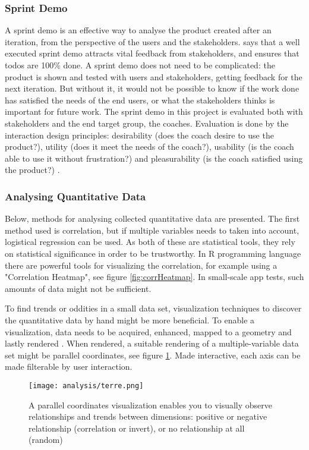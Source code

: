 \subsubsection{Sprint Demo}
A sprint demo is an effective way to analyse the product created after an iteration, from the perspective of the users and the stakeholders. \cite{kniberg} says that a well executed sprint demo attracts vital feedback from stakeholders, and ensures that todos are 100\% done. A sprint demo does not need to be complicated: the product is shown and tested with users and stakeholders, getting feedback for the next iteration. But without it, it would not be possible to know if the work done has satisfied the needs of the end users, or what the stakeholders thinks is important for future work. The sprint demo in this project is evaluated both with stakeholders and the end target group, the coaches. Evaluation is done by the interaction design principles: desirability (does the coach desire to use the product?), utility (does it meet the needs of the coach?), usability (is the coach able to use it without frustration?) and pleasurability (is the coach satisfied using the product?) \citep{lowgren}.

\subsubsection{Analysing Quantitative Data}
Below, methods for analysing collected quantitative data are presented. The first method used is correlation, but if multiple variables needs to taken into account, logistical regression can be used. As both of these are statistical tools, they rely on statistical significance in order to be trustworthy. In R programming language there are powerful tools for visualizing the correlation, for example using a "Correlation Heatmap", see figure \ref{fig:corrHeatmap}. In small-scale app tests, such amounts of data might not be sufficient.

To find trends or oddities in a small data set, visualization techniques to discover the quantitative data by hand might be more beneficial. To enable a visualization, data needs to be acquired, enhanced, mapped to a geometry and lastly rendered \citep{timo-ropinski-liu}. When rendered, a suitable rendering of a multiple-variable data set might be parallel coordinates, see figure \ref{fig:uneTerre}. Made interactive, each axis can be made filterable by user interaction.

\begin{figure}[h]
    \centering
    \texttt{[image: analysis/terre.png]}
    \caption{A parallel coordinates visualization enables you to visually observe relationships and trends between dimensions: positive or negative relationship (correlation or invert), or no relationship at all (random) \cite{une-terre}}
    \label{fig:uneTerre}
\end{figure}

